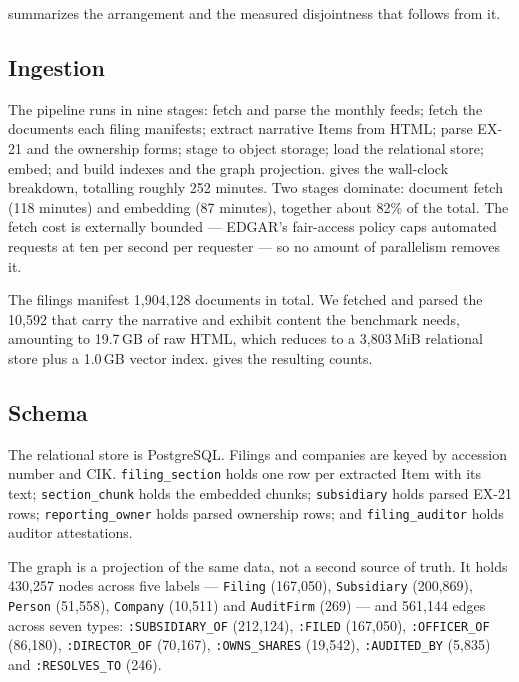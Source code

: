  summarizes the arrangement and the measured disjointness
that follows from it.

\subsection{Ingestion}

The pipeline runs in nine stages: fetch and parse the monthly feeds; fetch the
documents each filing manifests; extract narrative Items from HTML; parse EX-21
and the ownership forms; stage to object storage; load the relational store;
embed; and build indexes and the graph projection.  gives the
wall-clock breakdown, totalling roughly 252 minutes. Two stages dominate:
document fetch (118 minutes) and embedding (87 minutes), together about 82\% of
the total. The fetch cost is externally bounded --- EDGAR's fair-access policy
caps automated requests at ten per second per requester
\citep{sec2024edgar} --- so no amount of parallelism removes it.

The filings manifest 1{,}904{,}128 documents in total. We fetched and parsed the
10{,}592 that carry the narrative and exhibit content the benchmark needs,
amounting to 19.7\,GB of raw HTML, which reduces to a 3{,}803\,MiB relational
store plus a 1.0\,GB vector index.  gives the resulting counts.

\subsection{Schema}

The relational store is PostgreSQL. Filings and companies are keyed by accession
number and CIK. \texttt{filing\_section} holds one row per extracted Item with its
text; \texttt{section\_chunk} holds the embedded chunks; \texttt{subsidiary} holds
parsed EX-21 rows; \texttt{reporting\_owner} holds parsed ownership rows; and
\texttt{filing\_auditor} holds auditor attestations.

The graph is a projection of the same data, not a second source of truth. It holds
430{,}257 nodes across five labels --- \texttt{Filing} (167{,}050),
\texttt{Subsidiary} (200{,}869), \texttt{Person} (51{,}558), \texttt{Company}
(10{,}511) and \texttt{AuditFirm} (269) --- and 561{,}144 edges across seven
types: \texttt{:SUBSIDIARY\_OF} (212{,}124), \texttt{:FILED} (167{,}050),
\texttt{:OFFICER\_OF} (86{,}180), \texttt{:DIRECTOR\_OF} (70{,}167),
\texttt{:OWNS\_SHARES} (19{,}542), \texttt{:AUDITED\_BY} (5{,}835) and
\texttt{:RESOLVES\_TO} (246).

